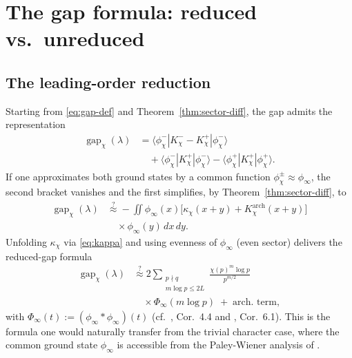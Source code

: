 \documentclass[10pt,twocolumn]{article}
\theoremstyle{definition}
\theoremstyle{remark}
\newcommand{\gap}{\operatorname{gap}}
\newcommand{\chifn}{\chi}
\begin{document}
\section{The gap formula: reduced vs.\ unreduced}
\label{sec:formula}

\subsection{The leading-order reduction}
\label{sec:formula-reduced}

Starting from \eqref{eq:gap-def} and
Theorem~\ref{thm:sector-diff}, the gap admits the representation
\begin{equation}
\label{eq:gap-matrix}
\begin{aligned}
  \gap_{\chifn}(\lambda)
    &= \langle\phi_{\chifn}^-|K_{\chifn}^--K_{\chifn}^+|\phi_{\chifn}^-\rangle\\
    &\quad + \langle\phi_{\chifn}^-|K_{\chifn}^+|\phi_{\chifn}^-\rangle
      - \langle\phi_{\chifn}^+|K_{\chifn}^+|\phi_{\chifn}^+\rangle.
\end{aligned}
\end{equation}
If one approximates both ground states by a common function
$\phi_{\chifn}^\pm\approx\phi_\infty$, the second bracket vanishes
and the first simplifies, by Theorem~\ref{thm:sector-diff}, to
\begin{equation}
\label{eq:gap-reduced}
\begin{aligned}
  \gap_{\chifn}(\lambda)
    &\overset{?}{\approx}
      -\iint \phi_\infty(x)\bigl[\kappa_{\chifn}(x+y)
      +K^{\mathrm{arch}}_{\chifn}(x+y)\bigr]\\
    &\quad\times\phi_\infty(y)\,dx\,dy.
\end{aligned}
\end{equation}
Unfolding $\kappa_{\chifn}$ via \eqref{eq:kappa} and using evenness
of $\phi_\infty$ (even sector) delivers the reduced-gap formula
\begin{equation}
\label{eq:gap-reduced-explicit}
\begin{aligned}
  \gap_{\chifn}(\lambda)
    &\overset{?}{\approx}
      2\sum_{\substack{p\nmid q\\m\log p\leq 2L}}
        \frac{\chifn(p)^m\log p}{p^{m/2}}\\
    &\quad\times\Phi_\infty(m\log p)
      \;+\;\text{arch.\ term},
\end{aligned}
\end{equation}
with $\Phi_\infty(t):=(\phi_\infty\ast\phi_\infty)(t)$
(cf.\ \cite{AnalyticKernel}, Cor.~4.4 and \cite{AnalyticGroundstate},
Cor.~6.1). This is the formula one would naturally transfer from the
trivial character case, where the common ground state $\phi_\infty$
is accessible from the Paley-Wiener analysis of \cite{RH_II}.
\end{document}
